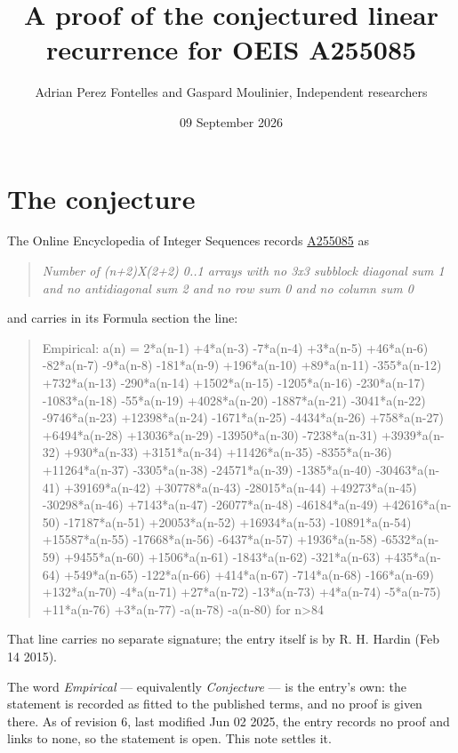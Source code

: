 \documentclass[11pt]{article}
\title{A proof of the conjectured linear recurrence for OEIS A255085}
\author{Adrian Perez Fontelles and Gaspard Moulinier, Independent researchers}
\date{09 September 2026}
\theoremstyle{definition}
\begin{document}
\maketitle
\section{The conjecture}

The Online Encyclopedia of Integer Sequences records \href{https://oeis.org/A255085}{A255085} as

\begin{quote}\itshape Number of (n+2)X(2+2) 0..1 arrays with no 3x3 subblock diagonal sum 1 and no antidiagonal sum 2 and no row sum 0 and no column sum 0\end{quote}

and carries in its Formula section the line:

\begin{quote}\ttfamily Empirical: a(n) = 2*a(n-1) +4*a(n-3) -7*a(n-4) +3*a(n-5) +46*a(n-6) -82*a(n-7) -9*a(n-8) -181*a(n-9) +196*a(n-10) +89*a(n-11) -355*a(n-12) +732*a(n-13) -290*a(n-14) +1502*a(n-15) -1205*a(n-16) -230*a(n-17) -1083*a(n-18) -55*a(n-19) +4028*a(n-20) -1887*a(n-21) -3041*a(n-22) -9746*a(n-23) +12398*a(n-24) -1671*a(n-25) -4434*a(n-26) +758*a(n-27) +6494*a(n-28) +13036*a(n-29) -13950*a(n-30) -7238*a(n-31) +3939*a(n-32) +930*a(n-33) +3151*a(n-34) +11426*a(n-35) -8355*a(n-36) +11264*a(n-37) -3305*a(n-38) -24571*a(n-39) -1385*a(n-40) -30463*a(n-41) +39169*a(n-42) +30778*a(n-43) -28015*a(n-44) +49273*a(n-45) -30298*a(n-46) +7143*a(n-47) -26077*a(n-48) -46184*a(n-49) +42616*a(n-50) -17187*a(n-51) +20053*a(n-52) +16934*a(n-53) -10891*a(n-54) +15587*a(n-55) -17668*a(n-56) -6437*a(n-57) +1936*a(n-58) -6532*a(n-59) +9455*a(n-60) +1506*a(n-61) -1843*a(n-62) -321*a(n-63) +435*a(n-64) +549*a(n-65) -122*a(n-66) +414*a(n-67) -714*a(n-68) -166*a(n-69) +132*a(n-70) -4*a(n-71) +27*a(n-72) -13*a(n-73) +4*a(n-74) -5*a(n-75) +11*a(n-76) +3*a(n-77) -a(n-78) -a(n-80) for n>84\end{quote}

That line carries no separate signature; the entry itself is by R. H. Hardin (Feb 14 2015).

The word {\itshape Empirical} --- equivalently {\itshape Conjecture} --- is the entry's own: the statement is recorded as fitted to the published terms, and no proof is given there. As of revision 6, last modified Jun 02 2025, the entry records no proof and links to none, so the statement is open. This note settles it.
\end{document}
